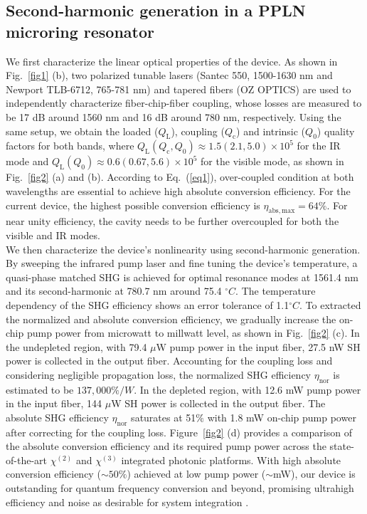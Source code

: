 \documentclass{WileyMSP-template}
\begin{document}
\subsection{Second-harmonic generation in a PPLN microring resonator}
We first characterize the linear optical properties of the device. As shown in Fig.~\ref{fig1} (b), two polarized tunable lasers (Santec 550, 1500-1630 nm and Newport TLB-6712, 765-781 nm) and tapered fibers (OZ OPTICS) are used to independently characterize fiber-chip-fiber coupling, whose losses are measured to be 17 dB around 1560 nm and 16 dB around 780 nm, respectively. Using the same setup, we obtain the loaded ($Q_\mathrm{L}$), coupling ($Q_\mathrm{c}$) and intrinsic ($Q_\mathrm{0}$) quality factors for both bands, where $Q_\mathrm{L} (Q_\mathrm{c},Q_\mathrm{0}) \approx 1.5 (2.1, 5.0)\times 10^5$ for the IR mode and $Q_\mathrm{L} (Q_\mathrm{0}) \approx 0.6 (0.67, 5.6)\times 10^5$ for the visible mode, as shown in Fig.~\ref{fig2} (a) and (b). According to Eq.~(\ref{eq1}), over-coupled condition at both wavelengths are essential to achieve high absolute conversion efficiency. For the current device, the highest possible conversion efficiency is $\eta_\mathrm{abs, max}=64\%$. For near unity efficiency, the cavity needs to be further overcoupled for both the visible and IR modes. \\


We then characterize the device's nonlinearity using second-harmonic generation. By sweeping the infrared pump laser and fine tuning the device's temperature, a quasi-phase matched SHG is achieved for optimal resonance modes at 1561.4 nm and its second-harmonic at 780.7 nm around 75.4 $^\circ C$. The temperature dependency of the SHG efficiency shows an error tolerance of 1.1$^\circ C$. To extracted the normalized and absolute conversion efficiency, we gradually increase the on-chip pump power from microwatt to millwatt level, as shown in Fig.~\ref{fig2} (c). In the undepleted region, with 79.4 $\mu$W pump power in the input fiber, 27.5 nW SH power is collected in the output fiber. Accounting for the coupling loss and considering negligible propagation loss, the normalized SHG efficiency $\eta_\mathrm{nor}$ is estimated to be $137,000 \%/W$. In the depleted region, with 12.6 mW pump power in the input fiber, 144 $\mu$W SH power is collected in the output fiber. The absolute SHG efficiency $\eta_\mathrm{nor}$ saturates at 51$\%$ with 1.8 mW on-chip pump power after correcting for the coupling loss. Figure~\ref{fig2} (d) provides a comparison of the absolute conversion efficiency and its required pump power across the state-of-the-art $\chi ^{(2)}$ and $\chi ^{(3)}$ integrated photonic platforms. With high absolute conversion efficiency ($\sim50\%$) achieved at low pump power ($\sim$mW), our device is outstanding for quantum frequency conversion and beyond, promising  ultrahigh efficiency and noise as desirable for system integration \cite{singh2019quantum,fan2021photon}.\\ 
\end{document}
